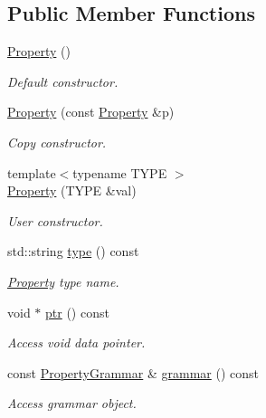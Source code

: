 \subsection*{Public Member Functions}
\begin{DoxyCompactItemize}
\item 
\hyperlink{class_d_d4hep_1_1_property_ab029377b86e5b8ae7513bf93f9c9a955}{Property} ()
\begin{DoxyCompactList}\small\item\em Default constructor. \end{DoxyCompactList}\item 
\hyperlink{class_d_d4hep_1_1_property_a357f17ec828b8fda35378db74fd3a830}{Property} (const \hyperlink{class_d_d4hep_1_1_property}{Property} \&p)
\begin{DoxyCompactList}\small\item\em Copy constructor. \end{DoxyCompactList}\item 
{\footnotesize template$<$typename T\+Y\+PE $>$ }\\\hyperlink{class_d_d4hep_1_1_property_a4fbd6d3df9b64d35d0f3e597ffb09356}{Property} (T\+Y\+PE \&val)
\begin{DoxyCompactList}\small\item\em User constructor. \end{DoxyCompactList}\item 
std\+::string \hyperlink{class_d_d4hep_1_1_property_a7861975224e3bb477939b39b208cd78c}{type} () const
\begin{DoxyCompactList}\small\item\em \hyperlink{class_d_d4hep_1_1_property}{Property} type name. \end{DoxyCompactList}\item 
void $\ast$ \hyperlink{class_d_d4hep_1_1_property_a10b0611f5f1ac530fccf6ff4def6d4fa}{ptr} () const
\begin{DoxyCompactList}\small\item\em Access void data pointer. \end{DoxyCompactList}\item 
const \hyperlink{class_d_d4hep_1_1_property_grammar}{Property\+Grammar} \& \hyperlink{class_d_d4hep_1_1_property_a2f865cd14e43b4f4ad8deaa5527d6fa1}{grammar} () const
\begin{DoxyCompactList}\small\item\em Access grammar object. \end{DoxyCompactList}\item 

\end{DoxyCompactItemize}
